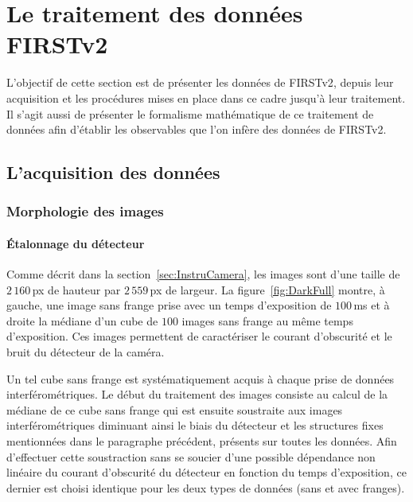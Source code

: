 \newpage\thispagestyle{empty}
\chapter{Le traitement des données FIRSTv2}
\label{sec:DataReduction}
\setcounter{figure}{0}
\setcounter{table}{0}
\setcounter{equation}{0}

\minitoc

\clearpage
L'objectif de cette section est de présenter les données de \ac{FIRSTv2}, depuis leur acquisition et les procédures mises en place dans ce cadre jusqu'à leur traitement. Il s'agit aussi de présenter le formalisme mathématique de ce traitement de données afin d'établir les observables que l'on infère des données de \ac{FIRSTv2}.


\section{L'acquisition des données}

\subsection{Morphologie des images}

\subsubsection{Étalonnage du détecteur}
\label{sec:CameraDark}

Comme décrit dans la section~\ref{sec:InstruCamera}, les images sont d'une taille de $2\,160 \,$px de hauteur par $2\,559 \,$px de largeur. La figure~\ref{fig:DarkFull} montre, à gauche, une image sans frange prise avec un temps d'exposition de $100 \,$ms et à droite la médiane d'un cube de $100$ images sans frange au même temps d'exposition. Ces images permettent de caractériser le courant d'obscurité et le bruit du détecteur de la caméra. 

Un tel cube sans frange est systématiquement acquis à chaque prise de données interférométriques. Le début du traitement des images consiste au calcul de la médiane de ce cube sans frange qui est ensuite soustraite aux images interférométriques diminuant ainsi le biais du détecteur et les structures fixes mentionnées dans le paragraphe précédent, présents sur toutes les données. Afin d'effectuer cette soustraction sans se soucier d'une possible dépendance non linéaire du courant d'obscurité du détecteur en fonction du temps d'exposition, ce dernier est choisi identique pour les deux types de données (sans et avec franges).

